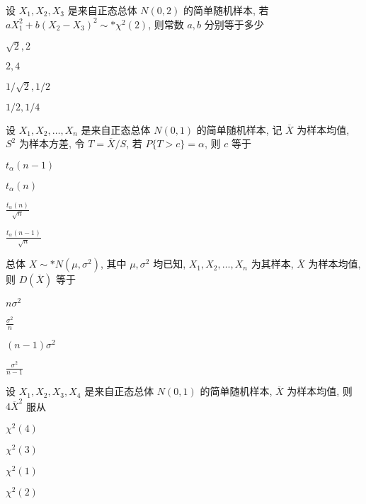 \documentclass{exam-zh}
\begin{document}
\begin{question}
  设 $X_1, X_2, X_3$ 是来自正态总体 $N(0, 2)$ 的简单随机样本, 若 $aX_1^2 + b(X_2 - X_3)^2 \sim* \chi^2(2)$, 则常数 $a, b$ 分别等于多少
  \paren[D]

  \begin{choices}
    \item $\sqrt{2}, 2$
    \item $2, 4$
    \item $1/\sqrt{2}, 1/2$
    \item $1/2, 1/4$
  \end{choices}
\end{question}

\begin{question}
  设 $X_1, X_2, \dots, X_n$ 是来自正态总体 $N(0, 1)$ 的简单随机样本, 记 $\overline{X}$ 为样本均值, $S^2$ 为样本方差, 令 $T = \overline{X} / S$, 若 $P\{T > c\} = \alpha$, 则 $c$ 等于
  \paren[D]

  \begin{choices}
    \item $t_\alpha(n-1)$
    \item $t_\alpha(n)$
    \item $\frac{t_\alpha(n)}{\sqrt{n}}$
    \item $\frac{t_\alpha(n-1)}{\sqrt{n}}$
  \end{choices}
\end{question}

\begin{question}
  总体 $X \sim* N(\mu, \sigma^2)$, 其中 $\mu, \sigma^2$ 均已知, $X_1, X_2, \dots, X_n$ 为其样本, $\overline{X}$ 为样本均值, 则 $D(\overline{X})$ 等于
  \paren[B]

  \begin{choices}
    \item $n\sigma^2$
    \item $\frac{\sigma^2}{n}$
    \item $(n-1)\sigma^2$
    \item $\frac{\sigma^2}{n-1}$
  \end{choices}
\end{question}

\begin{question}
  设 $X_1, X_2, X_3, X_4$ 是来自正态总体 $N(0, 1)$ 的简单随机样本, $\overline{X}$ 为样本均值, 则 $4\overline{X}^2$ 服从
  \paren[C]

  \begin{choices}
    \item $\chi^2(4)$
    \item $\chi^2(3)$
    \item $\chi^2(1)$
    \item $\chi^2(2)$
  \end{choices}
\end{question}
\end{document}
